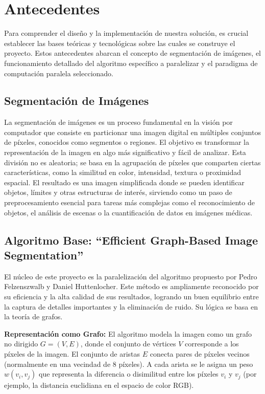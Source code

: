 \documentclass[fleqn,10pt]{article}
\begin{document}
\section{Antecedentes}
Para comprender el diseño y la implementación de nuestra solución, es crucial establecer las bases teóricas y tecnológicas sobre las cuales se construye el proyecto. Estos antecedentes abarcan el concepto de segmentación de imágenes, el funcionamiento detallado del algoritmo específico a paralelizar y el paradigma de computación paralela seleccionado.

\subsection{Segmentación de Imágenes}
La segmentación de imágenes es un proceso fundamental en la visión por computador que consiste en particionar una imagen digital en múltiples conjuntos de píxeles, conocidos como segmentos o regiones. El objetivo es transformar la representación de la imagen en algo más significativo y fácil de analizar. Esta división no es aleatoria; se basa en la agrupación de píxeles que comparten ciertas características, como la similitud en color, intensidad, textura o proximidad espacial. El resultado es una imagen simplificada donde se pueden identificar objetos, límites y otras estructuras de interés, sirviendo como un paso de preprocesamiento esencial para tareas más complejas como el reconocimiento de objetos, el análisis de escenas o la cuantificación de datos en imágenes médicas.

\subsection{Algoritmo Base: ``Efficient Graph-Based Image Segmentation''}
El núcleo de este proyecto es la paralelización del algoritmo propuesto por Pedro Felzenszwalb y Daniel Huttenlocher. Este método es ampliamente reconocido por su eficiencia y la alta calidad de sus resultados, logrando un buen equilibrio entre la captura de detalles importantes y la eliminación de ruido. Su lógica se basa en la teoría de grafos.

\textbf{Representación como Grafo:} El algoritmo modela la imagen como un grafo no dirigido $G=(V,E)$, donde el conjunto de vértices $V$ corresponde a los píxeles de la imagen. El conjunto de aristas $E$ conecta pares de píxeles vecinos (normalmente en una vecindad de 8 píxeles). A cada arista se le asigna un peso $w(v_i, v_j)$ que representa la diferencia o disimilitud entre los píxeles $v_i$ y $v_j$ (por ejemplo, la distancia euclidiana en el espacio de color RGB).
\end{document}
